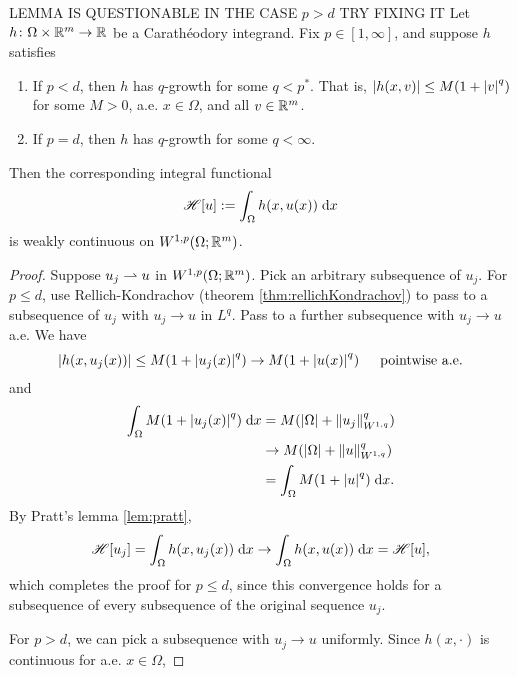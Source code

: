 \begin{lemma}
    {\color{red} LEMMA IS QUESTIONABLE IN THE CASE $p > d$ TRY FIXING IT}
    Let $h \colon \Omega \times \mathbb{R}^m \to \mathbb{R}$ be a Carath\'eodory integrand. Fix $p \in [1,\infty]$, and suppose $h$ satisfies 
    \begin{enumerate}[label={\rm (\roman*)}]
        \item If $p < d$, then $h$ has $q$-growth for some $q < p^*$. That is, $\left\lvert { h(x,v) } \right\rvert \leq M(1 + \left\lvert {v} \right\rvert^q)$ for some $M > 0$, a.e. $x \in \Omega$, and all $v \in \mathbb{R}^m$.
        \item If $p = d$, then $h$ has $q$-growth for some $q < \infty$.
    \end{enumerate}
    Then the corresponding integral functional 
    \begin{equation}
        \mathscr{H}[u] := \int_\Omega h(x,u(x)) \; \mathrm{d} x
    \end{equation}
    is weakly continuous on $W^{1,p}(\Omega;\mathbb{R}^m)$.
\end{lemma}
\begin{proof}
    Suppose $u_j \rightharpoonup u$ in $W^{1,p}(\Omega;\mathbb{R}^m)$. Pick an arbitrary subsequence of $u_j$. For $p \leq d$, use Rellich-Kondrachov (theorem \ref{thm:rellichKondrachov}) to pass to a subsequence of $u_j$ with $u_j \rightarrow u$ in $L^q$. Pass to a further subsequence with $u_j \rightarrow u$ a.e. We have 
    \begin{equation}
        \left\lvert {h(x,u_j(x))} \right\rvert \leq M(1 + \left\lvert {u_j(x)} \right\rvert^q) \rightarrow M(1+\left\lvert {u(x)} \right\rvert^q) \hspace{15pt} \text{pointwise a.e.}
    \end{equation}
    and
    \begin{equation} \begin{aligned}
        \int_\Omega M(1 + \left\lvert {u_j(x)} \right\rvert^q) \; \mathrm{d} x &= M(\left\lvert {\Omega} \right\rvert + \left\lVert {u_j} \right\rVert_{W^{1,q}}^q) \\
                                                  &\rightarrow M(\left\lvert {\Omega} \right\rvert + \left\lVert {u} \right\rVert_{W^{1,q}}^q) \\
                                                  &= \int_\Omega M(1 + \left\lvert {u} \right\rvert^q) \; \mathrm{d} x.
    \end{aligned} \end{equation}
    By Pratt's lemma \ref{lem:pratt}, 
    \begin{equation}
        \mathscr{H}[u_j] = \int_\Omega h(x,u_j(x)) \; \mathrm{d} x \rightarrow \int_\Omega h(x,u(x)) \; \mathrm{d} x = \mathscr{H}[u],
    \end{equation}
    which completes the proof for $p \leq d$, since this convergence holds for a subsequence of every subsequence of the original sequence $u_j$.

    For $p > d$, we can pick a subsequence with $u_j \rightarrow u$ uniformly. Since $h(x,\cdot)$ is continuous for a.e. $x \in \Omega$,
\end{proof}
